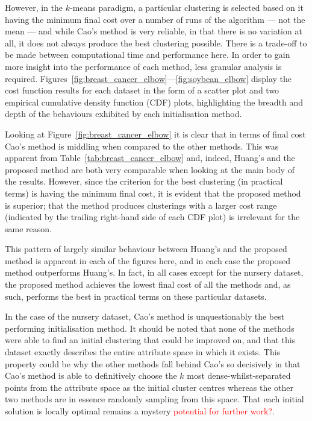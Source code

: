 However, in the \(k\)-means paradigm, a particular clustering is selected based
on it having the minimum final cost over a number of runs of the algorithm ---
not the mean --- and while Cao's method is very reliable, in that there is no
variation at all, it does not always produce the best clustering possible. There
is a trade-off to be made between computational time and performance here. In
order to gain more insight into the performance of each method, less granular
analysis is required.
Figures~\ref{fig:breast_cancer_elbow}---\ref{fig:soybean_elbow} display the
cost function results for each dataset in the form of a scatter plot and two
empirical cumulative density function (CDF) plots, highlighting the breadth and
depth of the behaviours exhibited by each initialisation method.

Looking at Figure~\ref{fig:breast_cancer_elbow} it is clear that in terms of
final cost Cao's method is middling when compared to the other methods. This
was apparent from Table~\ref{tab:breast_cancer_elbow} and, indeed, Huang's and
the proposed method are both very comparable when looking at the main body of
the results. However, since the criterion for the best clustering (in practical
terms) is having the minimum final cost, it is evident that the proposed method
is superior; that the method produces clusterings with a larger cost
range (indicated by the trailing right-hand side of each CDF plot) is irrelevant
for the same reason.

This pattern of largely similar behaviour between Huang's and the proposed
method is apparent in each of the figures here, and in each case the proposed
method outperforms Huang's. In fact, in all cases except for the nursery
dataset, the proposed method achieves the lowest final cost of all the methods
and, as such, performs the best in practical terms on these particular datasets.

In the case of the nursery dataset, Cao's method is unquestionably the best
performing initialisation method. It should be noted that none of the
methods were able to find an initial clustering that could be improved on, and
that this dataset exactly describes the entire attribute space in which it
exists. This property could be why the other methods fall behind Cao's so
decisively in that Cao's method is able to definitively choose the \(k\) most
dense-whilst-separated points from the attribute space as the initial cluster
centres whereas the other two methods are in essence randomly sampling from this
space. That each initial solution is locally optimal remains a mystery
\textcolor{red}{potential for further work?}.

